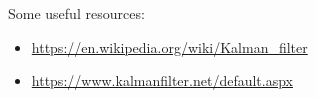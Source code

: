 \documentclass{article}
\begin{document}
                                                                                            Some useful resources:
                                                                                                \begin{itemize}
                                                                                                        \item \url{https://en.wikipedia.org/wiki/Kalman_filter} 
                                                                                                                \item  \url{https://www.kalmanfilter.net/default.aspx}  
                                                                                                                    \end{itemize}
                                                                                                                        
                                                                                                                            
                                                                                                                                
                                                                                                                                
\end{document}
